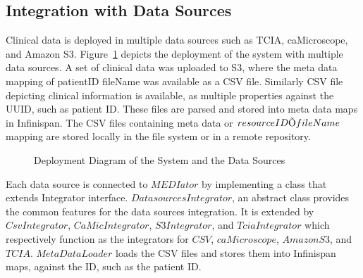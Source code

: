 \documentclass[conference]{IEEEtran}
\begin{document}
\subsection{Integration with Data Sources}
Clinical data is deployed in multiple data sources such as TCIA, caMicroscope, and Amazon S3. Figure~\ref{fig:dsdeployment} depicts the deployment of the system with multiple data sources. A set of clinical data was uploaded to S3, where the meta data mapping of patientID  fileName was available as a CSV file. Similarly CSV file depicting clinical information is available, as multiple properties against the UUID, such as patient ID. These files are parsed and stored into meta data maps in Infinispan. The CSV files containing meta data or $resource ID \ding{213} fileName$ mapping are stored locally in the file system or in a remote repository.
\begin{figure}[!htbp]
\begin{center}
\end{center}
 \vspace{-13pt}
 \caption{Deployment Diagram of the System and the Data Sources}
  \vspace{-13pt}
 \label{fig:dsdeployment}
\end{figure}

Each data source is connected to $MEDIator$ by implementing a class that extends Integrator interface. $DatasourcesIntegrator$, an abstract class provides the common features for the data sources integration. It is extended by $CsvIntegrator$, $CaMicIntegrator$, $S3Integrator$, and $TciaIntegrator$ which respectively function as the integrators for $CSV$, $caMicroscope$, $Amazon S3$, and $TCIA$. $MetaDataLoader$ loads the CSV files and stores them into Infinispan maps, against the ID, such as the patient ID. 
\end{document}
